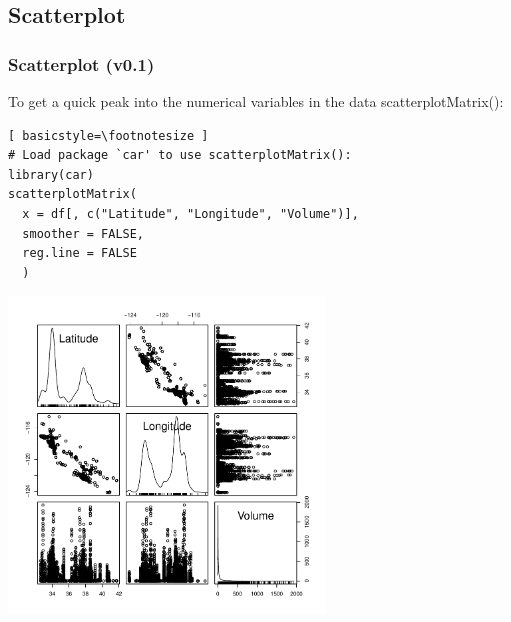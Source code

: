 \subsection{Scatterplot}
\begin{frame}
\frametitle{Scatterplot (v0.1)}

To get a quick peak into the numerical variables in the data \ttfamily scatterplotMatrix(): \normalfont
  		\begin{lstlisting}[ basicstyle=\footnotesize ]
# Load package `car' to use scatterplotMatrix():	
library(car)	
scatterplotMatrix(
  x = df[, c("Latitude", "Longitude", "Volume")], 
  smoother = FALSE, 
  reg.line = FALSE
  )
		\end{lstlisting}

        \begin{center}
         \includegraphics[width=0.63\textwidth]{images/scatterPlot_v0.pdf}
        \end{center}
\end{frame}


